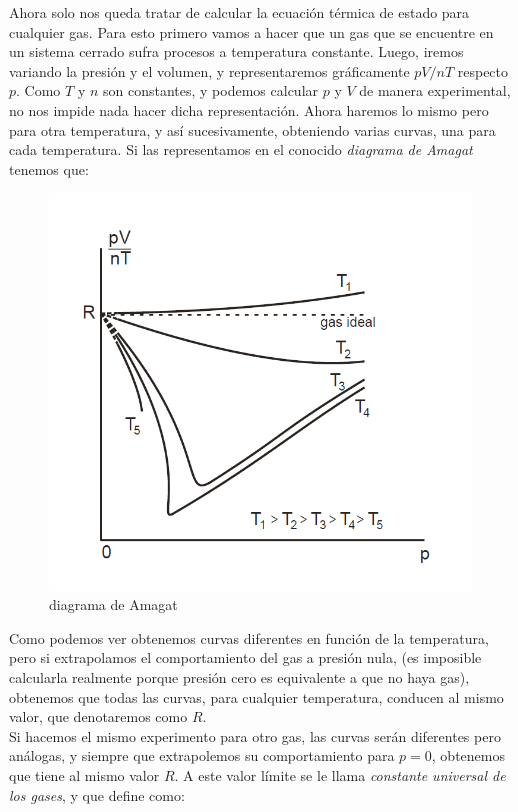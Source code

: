 \documentclass[12pt,a4paper]{article}
\begin{document}
Ahora solo nos queda tratar de calcular la ecuación térmica de estado para cualquier gas. Para esto primero vamos a hacer que un gas que se encuentre en un sistema cerrado sufra procesos a temperatura constante. Luego, iremos variando la presión y el volumen, y representaremos gráficamente $pV/nT$ respecto $p$. Como $T$ y $n$ son constantes, y podemos calcular $p$ y $V$ de manera experimental, no nos impide nada hacer dicha representación. Ahora haremos lo mismo pero para otra temperatura, y así sucesivamente, obteniendo varias curvas, una para cada temperatura. Si las representamos en el conocido \textit{diagrama de Amagat} tenemos que:

\begin{figure}[h!] \centering
\includegraphics[scale=0.55]{diagrama-amagat.png}
\caption{diagrama de Amagat}
\end{figure}


Como podemos ver obtenemos curvas diferentes en función de la temperatura, pero si extrapolamos el comportamiento del gas a presión nula, (es imposible calcularla realmente porque presión cero es equivalente a que no haya gas), obtenemos que todas las curvas, para cualquier temperatura, conducen al mismo valor, que denotaremos como $R$.  \\

Si hacemos el mismo experimento para otro gas, las curvas serán diferentes pero análogas, y siempre que extrapolemos su comportamiento para $p=0$, obtenemos que tiene al mismo valor $R$. A este valor límite se le llama \textit{constante universal de los gases}, y que define como:
\end{document}
